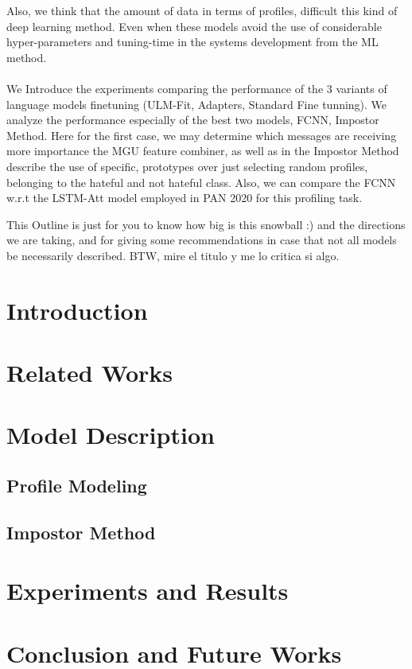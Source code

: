 \documentclass{llncs}
\begin{document}
	Also, we think that the amount of data in terms of profiles, difficult this kind of deep learning method. Even when these models avoid the use of considerable hyper-parameters and tuning-time in the systems development from the ML method.  \\\\
We Introduce the experiments comparing the performance of the 3 variants of language models finetuning (ULM-Fit, Adapters, Standard Fine tunning). We analyze the performance especially of the best two models, FCNN, Impostor Method. Here for the first case, we may determine which messages are receiving more importance the MGU feature combiner, as well as in the Impostor Method describe the use of specific, prototypes over just selecting random profiles, belonging to the hateful and not hateful class. Also, we can compare the FCNN w.r.t the LSTM-Att model employed in PAN 2020 for this profiling task.

This Outline is just for you to know how big is this snowball :) and the directions we are taking, and for giving some recommendations in case that not all models be necessarily described. BTW, mire el titulo y me lo critica si algo.

\section{Introduction}
\section{Related Works}
\section{Model Description}
\subsection{Profile Modeling}
\subsection{Impostor Method}
\section{Experiments and Results}
\section{Conclusion and Future Works}



\begin{raggedright}

\end{raggedright}
\end{document}
